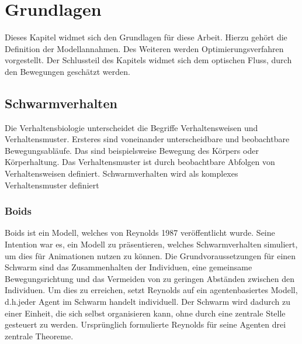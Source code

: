 \chapter{Grundlagen}\label{chap:grundlagen}
Dieses Kapitel widmet sich den Grundlagen für diese Arbeit. Hierzu gehört die Definition der Modellannahmen.
Des Weiteren werden Optimierungsverfahren vorgestellt. Der Schlussteil des Kapitels widmet sich dem optischen Fluss, durch den Bewegungen geschätzt werden.

\section{Schwarmverhalten}

Die Verhaltensbiologie unterscheidet die Begriffe Verhaltensweisen und Verhaltensmuster.
Ersteres sind voneinander unterscheidbare und beobachtbare Bewegungsabläufe. Das sind beispielsweise Bewegung des Körpers oder Körperhaltung. Das Verhaltensmuster ist durch beobachtbare Abfolgen von Verhaltensweisen definiert.
Schwarmverhalten wird als komplexes Verhaltensmuster definiert \cite{Hamann}

\subsection{Boids}\label{sec:Boids}
\usetikzlibrary{matrix,chains,positioning,decorations.pathreplacing,arrows,shapes,snakes}


Boids ist ein Modell, welches von Reynolds 1987 veröffentlicht wurde. Seine Intention war es, ein Modell zu präsentieren, welches Schwarmverhalten simuliert, um dies für Animationen nutzen zu können. Die Grundvoraussetzungen für einen Schwarm sind das Zusammenhalten der Individuen, eine gemeinsame Bewegungsrichtung und das Vermeiden von zu geringen Abständen zwischen den Individuen. Um dies zu erreichen, setzt Reynolds auf ein agentenbasiertes Modell, d.h.jeder Agent im Schwarm handelt individuell. Der Schwarm wird dadurch zu einer Einheit, die sich selbst organisieren kann, ohne durch eine zentrale Stelle gesteuert zu werden. Ursprünglich formulierte Reynolds für seine Agenten drei zentrale Theoreme.


